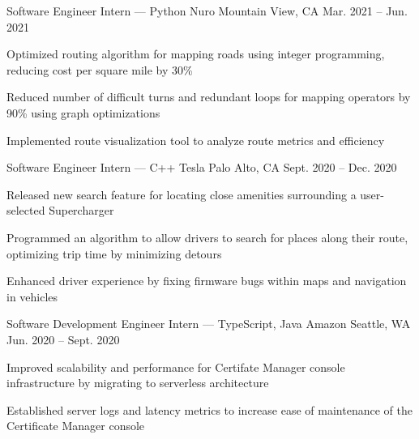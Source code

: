 \documentclass[12pt, letterpaper]{awesome-cv}
\begin{document}
\begin{cventries}
  \cventry
    {Sof\/tware Engineer Intern — Python} %
    {Nuro} %
    {Mountain View, CA} %
    {Mar. 2021 -- Jun. 2021} %
    {
      \begin{cvitems} %
      	\item {Optimized routing algorithm for mapping roads using integer programming, reducing cost per square mile by 30\%}
      	\item {Reduced number of dif\/ficult turns and redundant loops for mapping operators by 90\% using graph optimizations}
      	\item {Implemented route visualization tool to analyze route metrics and ef\/ficiency}
      \end{cvitems}
    }

  \cventry
    {Sof\/tware Engineer Intern — C++} %
    {Tesla} %
    {Palo Alto, CA} %
    {Sept. 2020 -- Dec. 2020} %
    {
      \begin{cvitems} %
        \item {Released new search feature for locating close amenities surrounding a user-selected Supercharger}
        \item {Programmed an algorithm to allow drivers to search for places along their route, optimizing trip time by minimizing detours}
        \item {Enhanced driver experience by fixing firmware bugs within maps and navigation in vehicles}
      \end{cvitems}
    }

  \cventry
    {Sof\/tware Development Engineer Intern — TypeScript, Java} %
    {Amazon} %
    {Seattle, WA} %
    {Jun. 2020 -- Sept. 2020} %
    {
      \begin{cvitems} %
        \item {Improved scalability and performance for Certifate Manager console infrastructure by migrating to serverless architecture} 
        \item {Established server logs and latency metrics to increase ease of maintenance of the Certificate Manager console}
      \end{cvitems}
    }


\end{cventries}
\end{document}
